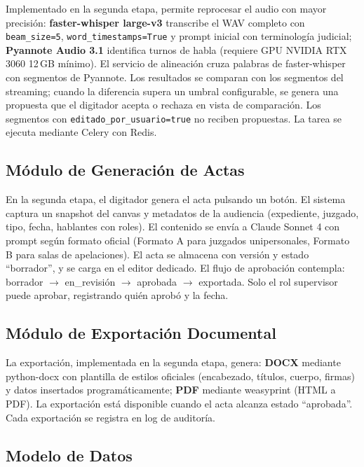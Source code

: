 \documentclass[12pt,a4paper,oneside]{report}
\begin{document}
Implementado en la segunda etapa, permite reprocesar el audio con mayor precisión: \textbf{faster-whisper large-v3} transcribe el WAV completo con \texttt{beam\_size=5}, \texttt{word\_timestamps=True} y prompt inicial con terminología judicial; \textbf{Pyannote Audio 3.1} identifica turnos de habla (requiere GPU NVIDIA RTX 3060 12\,GB mínimo). El servicio de alineación cruza palabras de faster-whisper con segmentos de Pyannote. Los resultados se comparan con los segmentos del streaming; cuando la diferencia supera un umbral configurable, se genera una propuesta que el digitador acepta o rechaza en vista de comparación. Los segmentos con \texttt{editado\_por\_usuario=true} no reciben propuestas. La tarea se ejecuta mediante Celery con Redis.

\subsection{Módulo de Generación de Actas}

En la segunda etapa, el digitador genera el acta pulsando un botón. El sistema captura un snapshot del canvas y metadatos de la audiencia (expediente, juzgado, tipo, fecha, hablantes con roles). El contenido se envía a Claude Sonnet 4 con prompt según formato oficial (Formato A para juzgados unipersonales, Formato B para salas de apelaciones). El acta se almacena con versión y estado ``borrador'', y se carga en el editor dedicado. El flujo de aprobación contempla: borrador $\to$ en\_revisión $\to$ aprobada $\to$ exportada. Solo el rol supervisor puede aprobar, registrando quién aprobó y la fecha.

\subsection{Módulo de Exportación Documental}

La exportación, implementada en la segunda etapa, genera: \textbf{DOCX} mediante python-docx con plantilla de estilos oficiales (encabezado, títulos, cuerpo, firmas) y datos insertados programáticamente; \textbf{PDF} mediante weasyprint (HTML a PDF). La exportación está disponible cuando el acta alcanza estado ``aprobada''. Cada exportación se registra en log de auditoría.

\subsection{Modelo de Datos}
\end{document}
